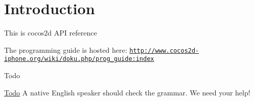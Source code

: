 \hypertarget{index_intro}{}\section{Introduction}\label{index_intro}
This is cocos2d A\-P\-I reference

The programming guide is hosted here\-: \href{http://www.cocos2d-iphone.org/wiki/doku.php/prog_guide:index}{\tt http\-://www.\-cocos2d-\/iphone.\-org/wiki/doku.\-php/prog\-\_\-guide\-:index}





\begin{DoxyRefDesc}{Todo}
\item[\hyperlink{todo__todo000001}{Todo}]A native English speaker should check the grammar. We need your help!\end{DoxyRefDesc}
